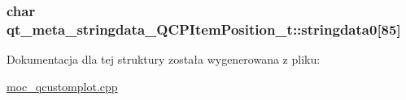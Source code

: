 \subsubsection[{\texorpdfstring{stringdata0}{stringdata0}}]{\setlength{\rightskip}{0pt plus 5cm}char qt\+\_\+meta\+\_\+stringdata\+\_\+\+Q\+C\+P\+Item\+Position\+\_\+t\+::stringdata0\mbox{[}85\mbox{]}}\hypertarget{structqt__meta__stringdata___q_c_p_item_position__t_a0321410c49080a232c195e07eac0ea1a}{}\label{structqt__meta__stringdata___q_c_p_item_position__t_a0321410c49080a232c195e07eac0ea1a}


Dokumentacja dla tej struktury została wygenerowana z pliku\+:\begin{DoxyCompactItemize}
\item 
\hyperlink{moc__qcustomplot_8cpp}{moc\+\_\+qcustomplot.\+cpp}\end{DoxyCompactItemize}
